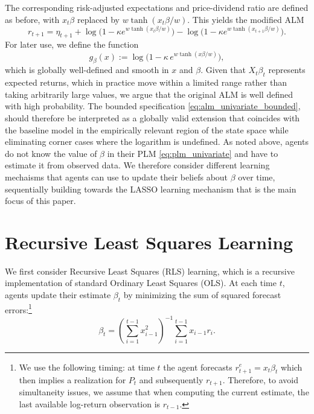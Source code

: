 \documentclass[11pt]{article}
\begin{document}
The corresponding risk-adjusted expectations and price-dividend ratio are defined as before, with $x_t \beta$ replaced by $w \tanh(x_t \beta / w)$. This yields the modified ALM
\begin{equation}\label{eq:alm_univariate_bounded}
    r_{t+1} = \eta_{t+1}
    + \log\bigl(1 - \kappa e^{w \tanh(x_t \beta / w)}\bigr)
    - \log\bigl(1 - \kappa e^{w \tanh(x_{t+1} \beta / w)}\bigr).
\end{equation}
For later use, we define the function
\begin{equation}\label{eq:g_beta_def}
    g_{\beta}(x) 
    := \log\bigl(1 - \kappa\, e^{w \tanh(x \beta/w)}\bigr),
\end{equation}
which is globally well-defined and smooth in $x$ and $\beta$. Given that $X_t \beta_t$ represents expected returns, which in practice move within a limited range rather than taking arbitrarily large values, we argue that the original ALM is well defined with high probability.
The bounded specification \eqref{eq:alm_univariate_bounded}, should therefore be interpreted as a globally valid extension that coincides with the baseline model in the empirically relevant region of the state space while eliminating corner cases where the logarithm is undefined.
As noted above, agents do not know the value of $\beta$ in their PLM \eqref{eq:plm_univariate} and have to estimate it from observed data.
We therefore consider different learning mechaisms that agents can use to update their beliefs about $\beta$ over time, sequentially building towards the LASSO learning mechanism that is the main focus of this paper.

\section{Recursive Least Squares Learning}\label{sec:rec_ls}

We first consider Recursive Least Squares (RLS) learning, which is a recursive implementation of standard Ordinary Least Squares (OLS). At each time $t$, agents update their estimate $\beta_t$ by minimizing the sum of squared forecast errors:\footnote{We use the following timing: at time $t$ the agent forecasts $r^e_{t+1} = x_t \beta_t$ which then implies a realization for $P_t$ and subsequently $r_{t+1}$. Therefore, to avoid simultaneity issues, we assume that when computing the current estimate, the last available log-return observation is $r_{t-1}$.}
\begin{equation}
    \beta_t = \left(\sum^{t-1}_{i=1} x_{i-1}^2 \right)^{-1} \sum^{t-1}_{i=1} x_{i-1} r_i.
\end{equation}
\end{document}
